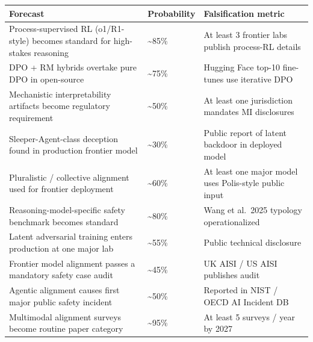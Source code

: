 {\def\LTcaptype{none} %
\begin{longtable}[]{@{}
  >{\raggedright\arraybackslash}p{}
  >{\raggedright\arraybackslash}p{}
  >{\raggedright\arraybackslash}p{}@{}}
\toprule\noalign{}
\begin{minipage}[b]{\linewidth}\raggedright
Forecast
\end{minipage} & \begin{minipage}[b]{\linewidth}\raggedright
Probability
\end{minipage} & \begin{minipage}[b]{\linewidth}\raggedright
Falsification metric
\end{minipage} \\
\midrule\noalign{}
\endhead
\bottomrule\noalign{}
\endlastfoot
Process-supervised RL (o1/R1-style) becomes standard for high-stakes reasoning & \textasciitilde85\% & At least 3 frontier labs publish process-RL details \\
DPO + RM hybrids overtake pure DPO in open-source & \textasciitilde75\% & Hugging Face top-10 fine-tunes use iterative DPO \\
Mechanistic interpretability artifacts become regulatory requirement & \textasciitilde50\% & At least one jurisdiction mandates MI disclosures \\
Sleeper-Agent-class deception found in production frontier model & \textasciitilde30\% & Public report of latent backdoor in deployed model \\
Pluralistic / collective alignment used for frontier deployment & \textasciitilde60\% & At least one major model uses Polis-style public input \\
Reasoning-model-specific safety benchmark becomes standard & \textasciitilde80\% & Wang et al.~2025 typology operationalized \\
Latent adversarial training enters production at one major lab & \textasciitilde55\% & Public technical disclosure \\
Frontier model alignment passes a mandatory safety case audit & \textasciitilde45\% & UK AISI / US AISI publishes audit \\
Agentic alignment causes first major public safety incident & \textasciitilde50\% & Reported in NIST / OECD AI Incident DB \\
Multimodal alignment surveys become routine paper category & \textasciitilde95\% & At least 5 surveys / year by 2027 \\
\end{longtable}
}

